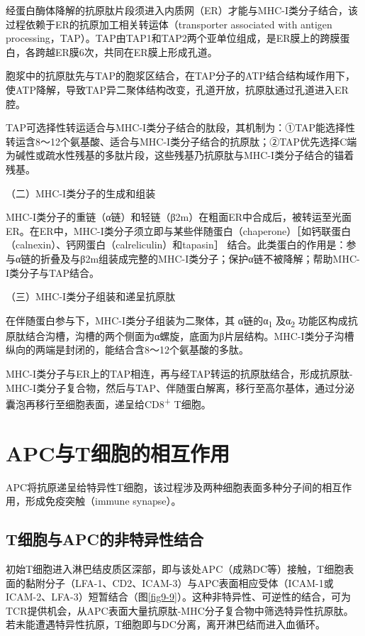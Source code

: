 经蛋白酶体降解的抗原肽片段须进入内质网（ER）才能与MHC-I类分子结合，该过程依赖于ER的抗原加工相关转运体（transporter
associated with antigen
processing，TAP）。TAP由TAP1和TAP2两个亚单位组成，是ER膜上的跨膜蛋白，各跨越ER膜6次，共同在ER膜上形成孔道。

胞浆中的抗原肽先与TAP的胞浆区结合，在TAP分子的ATP结合结构域作用下，使ATP降解，导致TAP异二聚体结构改变，孔道开放，抗原肽通过孔道进入ER腔。

TAP可选择性转运适合与MHC-I类分子结合的肽段，其机制为：①TAP能选择性转运含8～12个氨基酸、适合与MHC-I类分子结合的抗原肽；②TAP优先选择C端为碱性或疏水性残基的多肽片段，这些残基乃抗原肽与MHC-I类分子结合的锚着残基。

（二）MHC-I类分子的生成和组装

MHC-I类分子的重链（α链）和轻链（β2m）在粗面ER中合成后，被转运至光面ER。在ER中，MHC-I类分子须立即与某些伴随蛋白（chaperone）［如钙联蛋白（calnexin）、钙网蛋白（calreliculin）和tapasin］
结合。此类蛋白的作用是：参与α链的折叠及与β2m组装成完整的MHC-I类分子；保护α链不被降解；帮助MHC-I类分子与TAP结合。

（三）MHC-I类分子组装和递呈抗原肽

在伴随蛋白参与下，MHC-I类分子组装为二聚体，其 α链的α\textsubscript{1}
及α\textsubscript{2}
功能区构成抗原肽结合沟槽，沟槽的两个侧面为α螺旋，底面为β片层结构。MHC-I类分子沟槽纵向的两端是封闭的，能结合含8～12个氨基酸的多肽。

MHC-I类分子与ER上的TAP相连，再与经TAP转运的抗原肽结合，形成抗原肽-MHC-I类分子复合物，然后与TAP、伴随蛋白解离，移行至高尔基体，通过分泌囊泡再移行至细胞表面，递呈给CD8\textsuperscript{+}
T细胞。

\section{APC与T细胞的相互作用}

APC将抗原递呈给特异性T细胞，该过程涉及两种细胞表面多种分子间的相互作用，形成免疫突触（immune
synapse）。


\subsection{T细胞与APC的非特异性结合}

初始T细胞进入淋巴结皮质区深部，即与该处APC（成熟DC等）接触，T细胞表面的黏附分子（LFA-1、CD2、ICAM-3）与APC表面相应受体（ICAM-1或ICAM-2、LFA-3）短暂结合（图\ref{fig9-9}）。这种非特异性、可逆性的结合，可为TCR提供机会，从APC表面大量抗原肽-MHC分子复合物中筛选特异性抗原肽。若未能遭遇特异性抗原，T细胞即与DC分离，离开淋巴结而进入血循环。

